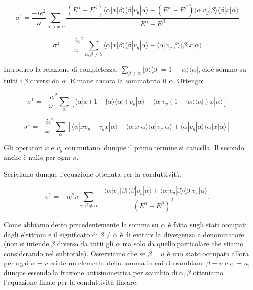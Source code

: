 \documentclass[12pt,a4paper]{article}
\begin{document}
\[
\sigma^1 = \frac{-ie^2}{\omega} \sum_{\alpha,\beta \neq \alpha} \frac{(E^{\alpha}-E^{\beta})\langle \alpha|x|\beta \rangle \langle \beta|v_y|\alpha \rangle - (E^{\alpha}-E^{\beta})\langle \alpha|v_y|\beta \rangle \langle \beta|x|\alpha \rangle}{E^{\alpha} - E^{\beta}}
\]

\[
\sigma^1 = \frac{-ie^2}{\omega} \sum_{\alpha,\beta \neq \alpha} \langle \alpha|x|\beta \rangle \langle \beta|v_y|\alpha \rangle - \langle \alpha|v_y|\beta \rangle \langle \beta|x|\alpha \rangle
\]


Introduco la relazione di completezza: $\sum_{\beta \neq \alpha} |\beta \rangle\langle \beta| = 1 - |\alpha \rangle\langle \alpha|$, cioè sommo su tutti i $\beta$ diversi da $\alpha$. Rimane ancora la sommatoria il $\alpha$. Ottengo:

\[
\sigma^1 = \frac{-ie^2}{\omega} \sum_{\alpha} \left[ \langle \alpha|x\left( 1 - |\alpha\rangle \langle \alpha| \right) v_y|\alpha \rangle - \langle \alpha|v_y \left( 1 - | \alpha\rangle \langle \alpha|  \right) x|\alpha \rangle \right]
\]

\[
\sigma^1 = \frac{-ie^2}{\omega} \sum_{\alpha} \left[ \langle \alpha|xv_y - v_yx |\alpha \rangle - \langle \alpha|x | \alpha\rangle \langle \alpha|  v_y|\alpha \rangle + \langle \alpha|v_y | \alpha \rangle \langle \alpha|  x| \alpha \rangle \right]
\]

Gli operatori $x$ e $v_y$ commutano, dunque il primo termine si cancella. Il secondo anche è nullo per ogni $\alpha$.

Scriviamo dunque l'equazione ottenuta per la conduttività:

\begin{equation}
\sigma^2 = -ie^2\hbar \sum_{\alpha,\beta \neq \alpha} \frac{- \langle \alpha|v_x|\beta \rangle \langle \beta|v_y|\alpha \rangle + \langle \alpha|v_y|\beta \rangle \langle \beta|v_x|\alpha \rangle}{(E^\alpha - E^\beta)^2} .
\end{equation}

Come abbiamo detto precedentemente la somma  su $\alpha$ è fatta sugli stati occupati dagli elettroni e il significato di $\beta \neq \alpha$ è di evitare la divergenza a denominatore (non si intende $\beta$ diverso da tutti gli $\alpha$ ma solo da quello particolare che stiamo considerando nel subtotale). Osserviamo che se $\beta = u$ è uno stato occupato allora per ogni $\alpha = v$ esiste un elemento della somma in cui si scambiano $\beta = v$ e $\alpha = u$, dunque essendo la frazione antisimmetrica per scambio di $\alpha, \beta$ otteniamo l'equazione finale per la conduttività lineare:
\end{document}
